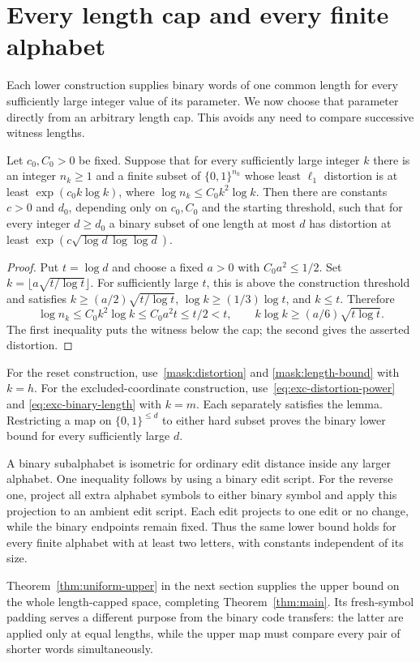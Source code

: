 \section{Every length cap and every finite alphabet}\label{sec:assembly}

Each lower construction supplies binary words of one common length for
every sufficiently large integer value of its parameter. We now choose that
parameter directly from an arbitrary length cap. This avoids any need to
compare successive witness lengths.

\begin{lemma}\label{assembly:inversion}
Let $c_0,C_0>0$ be fixed. Suppose that for every sufficiently large integer
$k$ there is an integer $n_k\geq1$ and a finite subset of $\{0,1\}^{n_k}$ whose least $\ell_1$ distortion is at least
$\exp(c_0k\log k)$, where $\log n_k\leq C_0k^2\log k$. Then there are
constants $c>0$ and $d_0$, depending only on $c_0,C_0$ and the starting
threshold, such that for every integer $d\geq d_0$ a binary subset of one
length at most $d$ has distortion at least
$\exp(c\sqrt{\log d\,\log\log d})$.
\end{lemma}
\begin{proof}
Put $t=\log d$ and choose a fixed $a>0$ with $C_0a^2\leq1/2$. Set
$k=\lfloor a\sqrt{t/\log t}\rfloor$. For sufficiently large $t$, this is
above the construction threshold and satisfies
$k\geq(a/2)\sqrt{t/\log t}$, $\log k\geq(1/3)\log t$, and $k\leq t$.
Therefore
\[
 \log n_k\leq C_0k^2\log k\leq C_0a^2t\leq t/2<t,
 \qquad k\log k\geq(a/6)\sqrt{t\log t}.
\]
The first inequality puts the witness below the cap; the second gives the
asserted distortion.
\end{proof}

For the reset construction, use~\eqref{mask:distortion} and
\eqref{mask:length-bound} with $k=h$. For the excluded-coordinate
construction, use~\eqref{eq:exc-distortion-power} and
\eqref{eq:exc-binary-length} with $k=m$. Each separately satisfies the
lemma. Restricting a map on $\{0,1\}^{\leq d}$ to either hard subset proves
the binary lower bound for every sufficiently large $d$.

A binary subalphabet is isometric for ordinary edit distance inside any
larger alphabet. One inequality follows by using a binary edit script.
For the reverse one, project all extra alphabet symbols to either binary
symbol and apply this projection to an ambient edit script. Each edit
projects to one edit or no change, while the binary endpoints remain fixed.
Thus the same lower bound holds for every finite alphabet with at least two
letters, with constants independent of its size.

Theorem~\ref{thm:uniform-upper} in the next section supplies the upper bound
on the whole length-capped space, completing Theorem~\ref{thm:main}. Its
fresh-symbol padding serves a different purpose from the binary code
transfers: the latter are applied only at equal lengths, while the upper
map must compare every pair of shorter words simultaneously.
